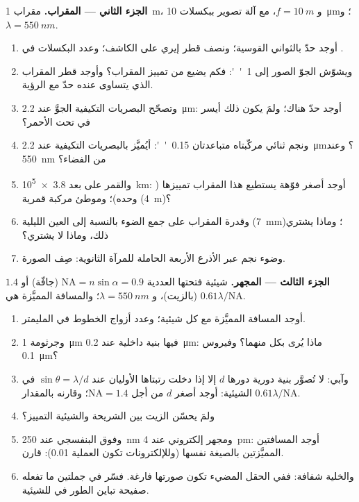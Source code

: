 \begin{problem}
\medskip
\noindent\textbf{الجزء الثاني --- المقراب.}
مقراب \qty{1}{m}، و $f = \qty{10}{m}$، مع آلة تصوير ببكسلات \qty{10}{\micro m}؛
و $\lambda = \qty{550}{nm}$.
\begin{enumerate}[resume]
  \item أوجد حدّ  بالثواني القوسية؛ ونصف قطر إيري على
        الكاشف؛ وعدد البكسلات في .
  \item ويشوّش الجوّ الصور إلى \qty{1}{''}: فكم يضيع من
        تمييز المقراب؟ وأوجد قطر المقراب الذي يتساوى عنده
        حدّ  مع الرؤية.
  \item وتصحّح البصريات التكيفية الجوَّ عند \qty{2.2}{\micro m}:
        أوجد حدّ  هناك؛ ولمَ يكون ذلك أيسر في تحت الأحمر؟
  \item ونجم ثنائي مركّبتاه متباعدتان \qty{0.15}{''}: أيُميَّز
        بالبصريات التكيفية عند \qty{2.2}{\micro m}؟ وعند \qty{550}{nm} من الفضاء؟
  \item والقمر على بعد \qty{3.8e5}{km}: أوجد أصغر فوّهة يستطيع هذا المقراب
        تمييزها ( وحده)؛ وموطئ مركبة قمرية (\qty{4}{m})؟
  \item وقدرة المقراب على جمع الضوء بالنسبة إلى
        العين الليلية (\qty{7}{mm})؛ وماذا يشتري ذلك، وماذا لا يشتري؟
  \item وضوء نجم عبر الأذرع الأربعة الحاملة للمرآة
        الثانوية: صِف الصورة.
\end{enumerate}

\medskip
\noindent\textbf{الجزء الثالث --- المجهر.}
شيئية فتحتها العددية $\mathrm{NA} = n\sin\alpha = 0.9$ (جافّة) أو $1.4$
(بالزيت)، و $\lambda = \qty{550}{nm}$؛ والمسافة المميَّزة هي $0.61\lambda/\mathrm{NA}$.
\begin{enumerate}[resume]
  \item أوجد المسافة المميَّزة مع كل شيئية؛ وعدد أزواج الخطوط
        في المليمتر.
  \item وجرثومة \qty{1}{\micro m} فيها بنية داخلية عند
        \qty{0.2}{\micro m}: ماذا يُرى بكل منهما؟ وفيروس \qty{0.1}{\micro m}؟
  \item وآبي: لا تُصوَّر بنية دورية دورها $d$ إلا إذا دخلت
        رتبتاها الأوليان عند $\sin\theta = \lambda/d$ في الشيئية: أوجد أصغر $d$
        من أجل $\mathrm{NA} = 1.4$؛ وقارنه بالمقدار $0.61\lambda/\mathrm{NA}$.
  \item ولمَ يحسّن الزيت بين الشريحة والشيئية
        التمييز؟
  \item وفوق البنفسجي عند \qty{250}{nm} ومجهر إلكتروني عند \qty{4}{pm}:
        أوجد المسافتين المميَّزتين بالصيغة نفسها (وللإلكترونات تكون
         العملية \qty{0.01}{}): قارن.
  \item والخلية شفافة: ففي الحقل المضيء تكون صورتها فارغة.
        فسّر في جملتين ما تفعله صفيحة تباين الطور في  للشيئية.
\end{enumerate}


\end{problem}
